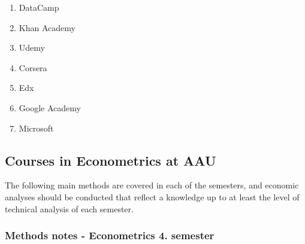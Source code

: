 \documentclass[
]{book}
\providecommand{\tightlist}{%
  \setlength{\itemsep}{0pt}\setlength{\parskip}{0pt}}
\begin{document}
\begin{enumerate}
\def\labelenumi{\arabic{enumi}.}
\tightlist
\item
  DataCamp
\item
  Khan Academy
\item
  Udemy
\item
  Corsera
\item
  Edx
\item
  Google Academy
\item
  Microsoft
\end{enumerate}

\hypertarget{courses-in-econometrics-at-aau}{%
\subsection{Courses in Econometrics at AAU}\label{courses-in-econometrics-at-aau}}

The following main methods are covered in each of the semesters, and economic analyses should be conducted that reflect a knowledge up to at least the level of technical analysis of each semester.

\hypertarget{methods-notes---econometrics-4.-semester}{%
\subsubsection{Methods notes - Econometrics 4. semester}\label{methods-notes---econometrics-4.-semester}}
\end{document}
